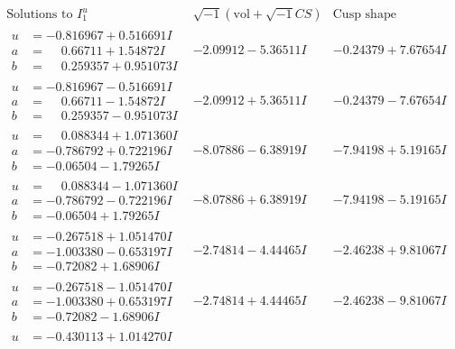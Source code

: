 \documentclass[1p]{elsarticle_modified}
\theoremstyle{definition}
\newcommand{\I}{\sqrt{-1}}
\begin{document}
$$\begin{array}{c|c|c}  
\text{Solutions to }I^u_{1}& \I (\text{vol} + \sqrt{-1}CS) & \text{Cusp shape}\\
 \hline 
\begin{aligned}
u &= -0.816967 + 0.516691 I \\
a &= \phantom{-}0.66711 + 1.54872 I \\
b &= \phantom{-}0.259357 + 0.951073 I\end{aligned}
 & -2.09912 - 5.36511 I & -0.24379 + 7.67654 I \\ \hline\begin{aligned}
u &= -0.816967 - 0.516691 I \\
a &= \phantom{-}0.66711 - 1.54872 I \\
b &= \phantom{-}0.259357 - 0.951073 I\end{aligned}
 & -2.09912 + 5.36511 I & -0.24379 - 7.67654 I \\ \hline\begin{aligned}
u &= \phantom{-}0.088344 + 1.071360 I \\
a &= -0.786792 + 0.722196 I \\
b &= -0.06504 - 1.79265 I\end{aligned}
 & -8.07886 - 6.38919 I & -7.94198 + 5.19165 I \\ \hline\begin{aligned}
u &= \phantom{-}0.088344 - 1.071360 I \\
a &= -0.786792 - 0.722196 I \\
b &= -0.06504 + 1.79265 I\end{aligned}
 & -8.07886 + 6.38919 I & -7.94198 - 5.19165 I \\ \hline\begin{aligned}
u &= -0.267518 + 1.051470 I \\
a &= -1.003380 - 0.653197 I \\
b &= -0.72082 + 1.68906 I\end{aligned}
 & -2.74814 - 4.44465 I & -2.46238 + 9.81067 I \\ \hline\begin{aligned}
u &= -0.267518 - 1.051470 I \\
a &= -1.003380 + 0.653197 I \\
b &= -0.72082 - 1.68906 I\end{aligned}
 & -2.74814 + 4.44465 I & -2.46238 - 9.81067 I \\ \hline\begin{aligned}
u &= -0.430113 + 1.014270 I \\

\end{aligned}
\end{array}$$
\end{document}
